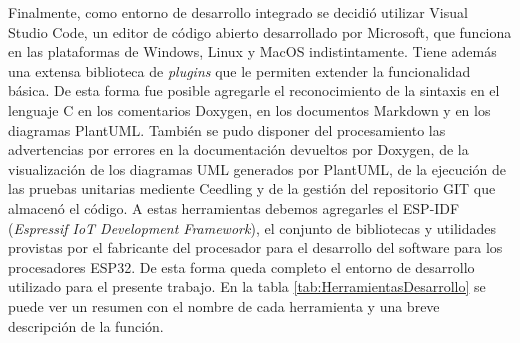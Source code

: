 Finalmente, como entorno de desarrollo integrado se decidió utilizar Visual Studio Code, un editor de código abierto desarrollado por Microsoft, que funciona en las plataformas de Windows, Linux y MacOS indistintamente. Tiene además una extensa biblioteca de \emph{plugins} que le permiten extender la funcionalidad básica. De esta forma fue posible agregarle el reconocimiento de la sintaxis en el lenguaje C en los comentarios Doxygen, en los documentos Markdown y en los diagramas PlantUML. También se pudo disponer del procesamiento las advertencias por errores en la documentación devueltos por Doxygen, de la visualización de los diagramas UML generados por PlantUML, de la ejecución de las pruebas unitarias mediente Ceedling y de la gestión del repositorio GIT que almacenó el código. A estas herramientas debemos agregarles el ESP-IDF (\emph{Espressif IoT Development Framework})\cite{noauthor_esp-idf_nodate}\cite{noauthor_espressifesp-idf_2020}, el conjunto de bibliotecas y utilidades provistas por el fabricante del procesador para el desarrollo del software para los procesadores ESP32. De esta forma queda completo el entorno de desarrollo utilizado para el presente trabajo. En la tabla \ref{tab:HerramientasDesarrollo} se puede ver un resumen con el nombre de cada herramienta y una breve descripción de la función.

